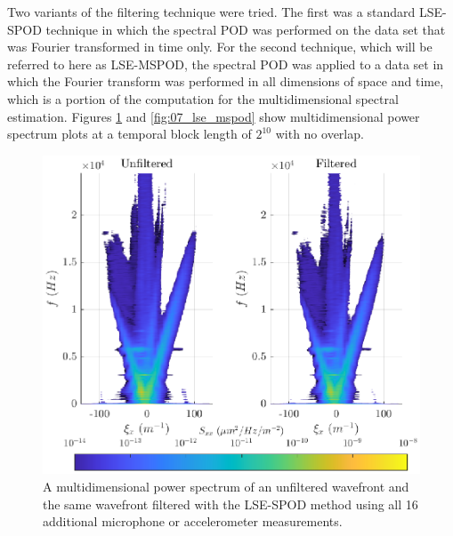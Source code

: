 Two variants of the filtering technique were tried.
The first was a standard LSE-SPOD technique in which the spectral POD was performed on the data set that was Fourier transformed in time only.
For the second technique, which will be referred to here as LSE-MSPOD, the spectral POD was applied to a data set in which the Fourier transform was performed in all dimensions of space and time, which is a portion of the computation for the multidimensional spectral estimation.
Figures \ref{fig:07_lse_spod} and \ref{fig:07_lse_mspod} show multidimensional power spectrum plots at a temporal block length of $2^{10}$ with no overlap.
\begin{figure}
  \centering
  \includegraphics{../matlab/07_multiple_sensor_filtering/lse_spod.eps}
  \caption{A multidimensional power spectrum of an unfiltered wavefront and the same wavefront filtered with the LSE-SPOD method using all 16 additional microphone or accelerometer measurements.  }
  \label{fig:07_lse_spod}
\end{figure}
